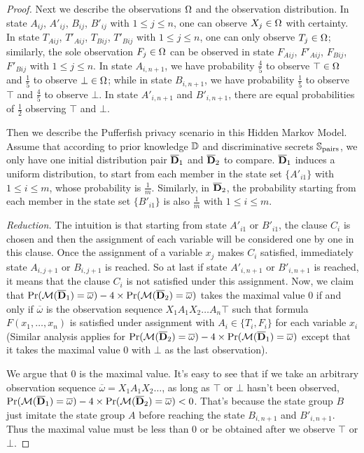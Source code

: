 \begin{proof}
  Next we describe the observations $\Omega$ and the observation distribution. In state
  $A_{ij}$, $A'_{ij}$, $B_{ij}$, $B'_{ij}$ with $1\leq j \leq n$, one can observe $X_j \in \Omega$ with certainty.
  In state $T_{Aij}$, $T'_{Aij}$, $T_{Bij}$, $T'_{Bij}$ with $1\leq j \leq n$, one can only observe $T_j \in \Omega$;
  similarly, the sole observation $F_j \in \Omega$ can be observed in state $F_{Aij}$, $F'_{Aij}$, $F_{Bij}$, $F'_{Bij}$ with $1\leq j \leq n$.
  In state $A_{i,n+1}$, we have probability $\frac{4}{5}$ to observe $\top \in \Omega$ and $\frac{1}{5}$  to observe $\bot \in \Omega$;
  while in state $B_{i,n+1}$, we have probability $\frac{1}{5}$ to observe $\top$ and $\frac{4}{5}$  to observe $\bot$.
  In state $A'_{i,n+1}$ and $B'_{i,n+1}$, there are equal probabilities of $\frac{1}{2}$ observing $\top$ and $\bot$.

  Then we describe the Pufferfish privacy scenario in this Hidden Markov Model. Assume that according to
  prior knowledge $\mathbb{D}$ and discriminative secrets $\mathbb{S}_{\textmd{pairs}}$, we only have
  one initial distribution pair $\overline{\mathbf{D}}_1$ and $\overline{\mathbf{D}}_2$ to compare. $\overline{\mathbf{D}}_1$ induces a uniform distribution,
  to start from each member in the state set $\{A'_{i1}\}$ with $1 \leq i \leq m$, whose probability is $\frac{1}{m}$.
  Similarly, in $\overline{\mathbf{D}}_2$, the probability starting from each member in the state set $\{B'_{i1}\}$ is also $\frac{1}{m}$ with $1 \leq i \leq m$.

  \textit{Reduction.} The intuition is that starting from state $A'_{i1}$ or $B'_{i1}$,
  the clause $C_i$ is chosen and then the assignment of each variable will be considered one by one
  in this clause. Once the assignment of a variable $x_j$ makes $C_i$ satisfied, immediately
  state $A_{i,j+1}$ or $B_{i,j+1}$ is reached. So at last if state $A'_{i,n+1}$ or $B'_{i,n+1}$
  is reached, it means that the clause $C_i$ is not satisfied under this assignment. Now, we 
  claim that  $\Pr (\mathcal{M} (\overline{\mathbf{D}}_1) = \overline{\omega}) - 4 \times \Pr (\mathcal{M} (\overline{\mathbf{D}}_2) = \overline{\omega})$ takes the maximal value $0$
  if and only if $\overline{\omega}$ is the observation sequence $X_1A_1X_2\ldots A_n \top$ such that
  formula $F(x_1,\ldots,x_n)$ is satisfied under assignment with $A_i \in \{T_i,F_i\}$ for each variable $x_i$
  (Similar analysis applies for $\Pr (\mathcal{M} (\overline{\mathbf{D}}_2) = \overline{\omega}) - 4 \times \Pr (\mathcal{M} (\overline{\mathbf{D}}_1) = \overline{\omega})$ except that it takes the
   maximal value $0$ with $\bot$ as the last observation).

  We argue that $0$ is the maximal value.
  It's easy to see that if we take an arbitrary observation sequence $\overline{\omega} = X_1A_1X_2\ldots $,
  as long as $\top$ or $\bot$ hasn't been observed, $\Pr (\mathcal{M} (\overline{\mathbf{D}}_1) = \overline{\omega}) -  4 \times \Pr (\mathcal{M} (\overline{\mathbf{D}}_2) = \overline{\omega}) < 0$.
  That's because the state group $B$ just imitate the state group $A$ before reaching the state
  $B_{i,n+1}$ and $B'_{i,n+1}$. Thus the maximal value must be less than 0 or be obtained after we observe $\top$
  or $\bot$.


\end{proof}
